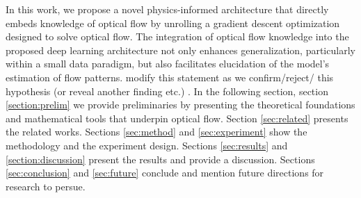 \IEEEPARstart{}{} In this work, we propose a novel physics-informed architecture that directly embeds knowledge of optical flow by unrolling a gradient descent optimization designed to solve optical flow. The integration of optical flow knowledge into the proposed deep learning architecture not only enhances generalization, particularly within a small data paradigm, but also facilitates elucidation of the model's estimation of flow patterns. \color{orange} modify this statement as we confirm/reject/ this hypothesis (or reveal another finding etc.) \color{black}.
\IEEEPARstart{}{} In the following section, section \ref{section:prelim} we provide preliminaries by presenting the theoretical foundations and mathematical tools that underpin optical flow. Section \ref{sec:related} presents the related works. Sections \ref{sec:method} and \ref{sec:experiment} show the methodology and the experiment design. Sections \ref{sec:results} and \ref{section:discussion} present the results and provide a discussion. Sections \ref{sec:conclusion} and \ref{sec:future} conclude and mention future directions for research to persue.